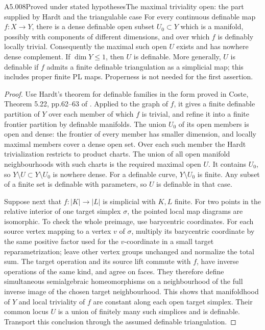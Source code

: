 \begin{saresult}{A5.008}{Proved under stated hypotheses}{The maximal triviality open: the part supplied by Hardt and the triangulable case}
For every continuous definable map $f:X\to Y$, there is a dense
definable open subset $U_0\subset Y$ which is a manifold, possibly
with components of different dimensions, and over which $f$ is
definably locally trivial.  Consequently the maximal such open
$U$ exists and has nowhere dense complement.  If $\dim Y\leq1$,
then $U$ is definable.  More generally, $U$ is definable if $f$
admits a finite definable triangulation as a simplicial map; this
includes proper finite PL maps.  Properness is not needed for
the first assertion.
\end{saresult}
\begin{proof}
Use Hardt's theorem for definable families in the form proved in
Coste, Theorem 5.22, pp.62--63 of \cite{A5-Coste}.  Applied to
the graph of $f$, it gives a finite definable partition of $Y$ over each member of
which $f$ is trivial, and refine it into a finite frontier partition
by definable manifolds.  The union $U_0$ of its open members is
open and dense: the frontier of every member has smaller dimension,
and locally maximal members cover a dense open set.  Over each
such member the Hardt trivialization restricts to product charts.
The union of all open manifold neighbourhoods with such charts is
the required maximal open $U$.  It contains $U_0$, so
$Y\setminus U\subset Y\setminus U_0$ is nowhere dense.  For a
definable curve, $Y\setminus U_0$ is finite.  Any subset of a finite
set is definable with parameters, so $U$ is definable in that case.

Suppose next that $f:|K|\to|L|$ is simplicial with $K,L$ finite.
For two points in the relative interior of one target simplex
$\sigma$, the pointed local map diagrams are isomorphic.  To
check the whole preimage, use barycentric coordinates.  For each
source vertex mapping to a vertex $v$ of $\sigma$, multiply its
barycentric coordinate by the same positive factor used for the
$v$-coordinate in a small target reparametrization; leave other
vertex groups unchanged and normalize the total sum.  The target
operation and its source lift commute with $f$, have inverse
operations of the same kind, and agree on faces.  They therefore
define simultaneous semialgebraic homeomorphisms on a neighbourhood
of the full inverse image of the chosen target neighbourhood.
This shows that manifoldhood of $Y$ and local triviality of $f$
are constant along each open target simplex.  Their common locus
$U$ is a union of finitely many such simplices and is definable.
Transport this conclusion through the assumed definable
triangulation.
\end{proof}

